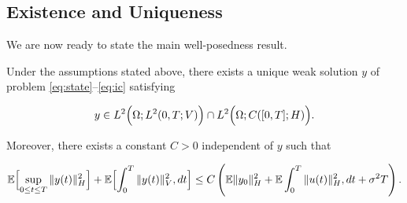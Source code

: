 \subsection{Existence and Uniqueness}

We are now ready to state the main well-posedness result.

\begin{theorem}
Under the assumptions stated above, there exists a unique weak solution \(y\) of problem 
\eqref{eq:state}--\eqref{eq:ic} satisfying

\[
y
\in
L^2
\Bigl(
\Omega;
L^2(0,T;V)
\Bigr)
\cap
L^2
\Bigl(
\Omega;
C([0,T];H)
\Bigr).
\]

Moreover, there exists a constant \(C>0\) independent of \(y\) such that

\[
\mathbb{E}
\Bigl[
\sup_{0\le t\le T}
\|y(t)\|_H^2
\Bigr]
+
\mathbb{E}
\Bigl[
\int_0^T
\|y(t)\|_V^2,dt
\Bigr]
\le
C
\left(
\mathbb{E}\|y_0\|_H^2
+
\mathbb{E}
\int_0^T
\|u(t)\|_H^2,dt
+
\sigma^2 T
\right).
\]
\label{thm:existence}
\end{theorem}


